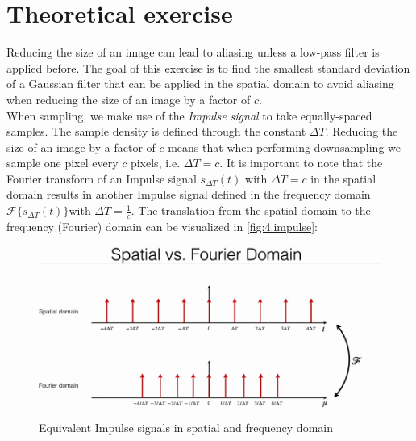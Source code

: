 \documentclass[tikz,14pt,fleqn]{article}
\begin{document}
\section{Theoretical exercise} \label{sec:3}

Reducing the size of an image can lead to aliasing unless a low-pass filter is applied before.
The goal of this exercise is to find the smallest standard deviation of a Gaussian filter that can be applied in the spatial domain to avoid aliasing when reducing the size of an image by a factor of $c$.\\

When sampling, we make use of the \textit{Impulse signal} to take equally-spaced samples. The sample density is defined through the constant $\Delta T$. Reducing the size of an image by a factor of $c$ means that when performing downsampling we sample one pixel every $c$ pixels, i.e. $\Delta T = c$. It is important to note that the Fourier transform of an Impulse signal $s_{\Delta T}(t)$ with $\Delta T = c$  in the spatial domain results in another Impulse signal defined in the frequency domain $\mathscr{F}\{s_{\Delta T}(t)\}$with $\Delta T = \frac{1}{c}$. The translation from the spatial domain to the frequency (Fourier) domain can be visualized in \autoref{fig:4.impulse}:
\begin{figure}[H]
    \centering
    \includegraphics[width=0.4\linewidth]{./fig/3.spatialfourier.png}
    \caption{Equivalent Impulse signals in spatial and frequency domain}
    \label{fig:4.impulse}
\end{figure}
\end{document}
